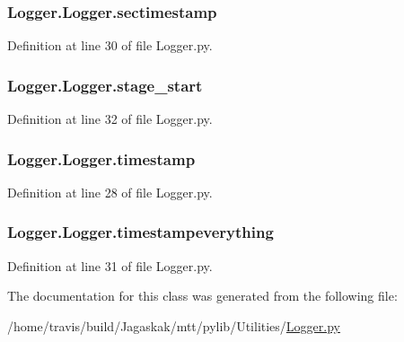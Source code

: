 \hypertarget{classLogger_1_1Logger_a9d1172c2a7abb0264b9e41368475ffe7}{
\subsubsection[{sectimestamp}]{\setlength{\rightskip}{0pt plus 5cm}Logger.\-Logger.\-sectimestamp}}\label{classLogger_1_1Logger_a9d1172c2a7abb0264b9e41368475ffe7}


Definition at line 30 of file Logger.\-py.

\hypertarget{classLogger_1_1Logger_a639adf5e0d4f73bdb942e9652903231f}{
\subsubsection[{stage\-\_\-start}]{\setlength{\rightskip}{0pt plus 5cm}Logger.\-Logger.\-stage\-\_\-start}}\label{classLogger_1_1Logger_a639adf5e0d4f73bdb942e9652903231f}


Definition at line 32 of file Logger.\-py.

\hypertarget{classLogger_1_1Logger_af1d68b73fec8eebd0abeafa3bc8fd98b}{
\subsubsection[{timestamp}]{\setlength{\rightskip}{0pt plus 5cm}Logger.\-Logger.\-timestamp}}\label{classLogger_1_1Logger_af1d68b73fec8eebd0abeafa3bc8fd98b}


Definition at line 28 of file Logger.\-py.

\hypertarget{classLogger_1_1Logger_a6012f50ab21e5ab3b89465a972b6a99d}{
\subsubsection[{timestampeverything}]{\setlength{\rightskip}{0pt plus 5cm}Logger.\-Logger.\-timestampeverything}}\label{classLogger_1_1Logger_a6012f50ab21e5ab3b89465a972b6a99d}


Definition at line 31 of file Logger.\-py.



The documentation for this class was generated from the following file\-:\begin{DoxyCompactItemize}
\item 
/home/travis/build/\-Jagaskak/mtt/pylib/\-Utilities/\hyperlink{Logger_8py}{Logger.\-py}\end{DoxyCompactItemize}
